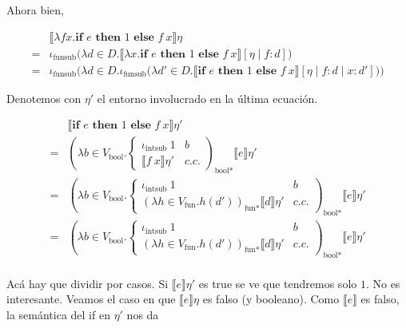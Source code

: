 \documentclass[article, 12pt]{article}
\begin{document}
Ahora bien, 

\begin{align*}
    &\llbracket \lambda fx.\textbf{if } e \textbf{ then } 1 \textbf{ else } f
    ~  x \rrbracket\eta \\
    =&\iota_{\text{funsub}} \Big( \lambda d \in D. \llbracket \lambda x.
    \textbf{if } e \textbf{ then } 1 \textbf{ else } f ~  x\rrbracket[\eta \mid
f : d] \Big) \\ 
=&\iota_{\text{funsub}} \Big(  \lambda d \in D. \iota_{\text{funsub}}\Big( \lambda d' \in D.
     \llbracket \textbf{if } e \textbf{ then } 1 \textbf{ else } f ~
x\rrbracket[\eta \mid f : d \mid x : d'] \Big) \Big) 
\end{align*}

Denotemos con $\eta'$ el entorno involucrado en la última ecuación.

\begin{align*}
    &\llbracket \textbf{if } e \textbf{ then } 1 \textbf{ else } f ~
    x\rrbracket\eta' \\ 
    =&\left( \lambda b \in V_{\text{bool}}.\begin{cases}
            \iota_{\text{intsub}} ~ 1  & b \\ 
            \llbracket f ~ x \rrbracket\eta' & c.c.
    \end{cases} \right)_{\text{bool}*} \llbracket e \rrbracket\eta' \\ 
    =&\left( \lambda b \in V_{\text{bool}}.\begin{cases}
            \iota_{\text{intsub}} ~ 1  & b \\ 
            (\lambda h \in V_{\text{fun}}. h(d'))_{\text{fun}*} \llbracket d
            \rrbracket\eta' & c.c.
    \end{cases} \right)_{\text{bool}*} \llbracket e \rrbracket\eta' \\ 
    =&\left( \lambda b \in V_{\text{bool}}.\begin{cases}
            \iota_{\text{intsub}} ~ 1  & b \\ 
            (\lambda h \in V_{\text{fun}}. h(d'))_{\text{fun}*} \llbracket d
            \rrbracket\eta' & c.c.
    \end{cases} \right)_{\text{bool}*} \llbracket e \rrbracket\eta' \\ 
\end{align*}

Acá hay que dividir por casos. Si $\llbracket e \rrbracket\eta'$ es true se ve
que tendremos solo $1$. No es interesante. Veamos el caso en que $\llbracket e
\rrbracket \eta$ es falso (y booleano). Como $\llbracket e \rrbracket$ es falso, 
la semántica del if en $\eta'$ nos da 
\end{document}
